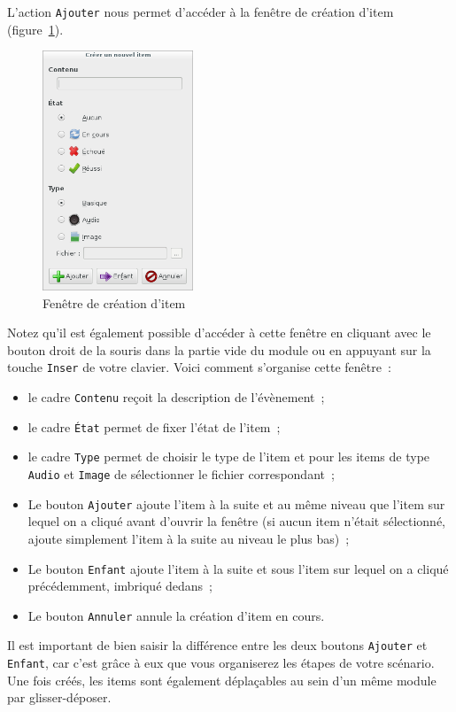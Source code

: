 \documentclass[a4paper,12pt]{article}
\newcommand*{\interfaceitem}[1]{\texttt{#1}}
\newcommand*{\guillemets}[1]{\og #1\fg{}\xspace}
\begin{document}
L'action \interfaceitem{Ajouter} nous permet d'accéder à la fenêtre de création d'item (figure~\ref{fig:ajout}).
\begin{figure}[ht]
    \centerline{\includegraphics[width=0.4\textwidth]{add_item}}
    \caption{Fenêtre de création d'item}
    \label{fig:ajout}
\end{figure}
Notez qu'il est également possible d'accéder à cette fenêtre en cliquant avec le bouton droit de la souris dans la partie vide du module ou en appuyant sur la touche \interfaceitem{Inser} de votre clavier.
Voici comment s'organise cette fenêtre~:
\begin{itemize}
    \item le cadre \interfaceitem{Contenu} reçoit la description de l'évènement~;
    \item le cadre \interfaceitem{État} permet de fixer l'état de l'item~;
    \item le cadre \interfaceitem{Type} permet de choisir le type de l'item et pour les items de type \interfaceitem{Audio} et \interfaceitem{Image} de sélectionner le fichier correspondant~;
    \item Le bouton \interfaceitem{Ajouter} ajoute l'item à la suite et au même niveau que l'item sur lequel on a cliqué avant d'ouvrir la fenêtre (si aucun item n'était sélectionné, ajoute simplement l'item à la suite au niveau le plus bas)~;
    \item Le bouton \interfaceitem{Enfant} ajoute l'item à la suite et sous l'item sur lequel on a cliqué précédemment, imbriqué dedans~;
    \item Le bouton \interfaceitem{Annuler} annule la création d'item en cours.
\end{itemize}
Il est important de bien saisir la différence entre les deux boutons \interfaceitem{Ajouter} et \interfaceitem{Enfant}, car c'est grâce à eux que vous organiserez les étapes de votre scénario.
Une fois créés, les items sont également déplaçables au sein d'un même module par \guillemets{glisser-déposer}.
\end{document}

